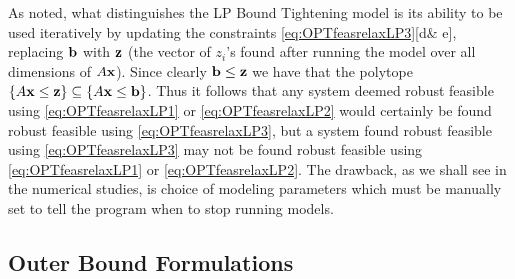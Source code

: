 \documentclass[11pt]{article}
\theoremstyle{plain}
\theoremstyle{definition}
\theoremstyle{remark}
\begin{document}
As noted, what distinguishes the LP Bound Tightening model is its ability to be used iteratively by updating the constraints \eqref{eq:OPTfeasrelaxLP3}[d\& e], replacing $\bold b$ with $\bold z$ (the vector of $z_i$'s found after running the model over all dimensions of $A\bold x$). 
Since clearly $\bold b\leq \bold z$ we have that the polytope $\{A\bold x\leq \bold z\}\subseteq\{A\bold x\leq \bold b\}$. 
Thus it follows that any system deemed robust feasible using \eqref{eq:OPTfeasrelaxLP1} or \eqref{eq:OPTfeasrelaxLP2} would certainly be found robust feasible using \eqref{eq:OPTfeasrelaxLP3}, but a system found robust feasible using \eqref{eq:OPTfeasrelaxLP3} may not be found robust feasible using \eqref{eq:OPTfeasrelaxLP1} or \eqref{eq:OPTfeasrelaxLP2}. 
The drawback, as we shall see in the numerical studies, is choice of modeling parameters which must be manually set to tell the program when to stop running models. 


\subsection{Outer Bound Formulations}
\end{document}
